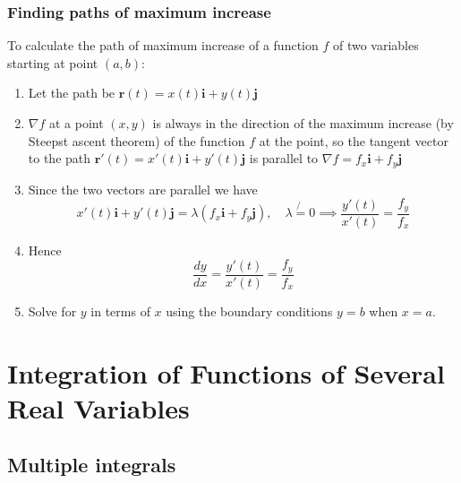 \documentclass[12pt]{article}
\begin{document}
		\subsubsection{Finding paths of maximum increase}
		To calculate the path of maximum increase of a function $f$ of two variables starting at point $(a,b)$:
		\begin{enumerate}
			\item Let the path be $\mathbf{r}(t) = x(t)\mathbf{i} + y(t)\mathbf{j}$
			\item $\nabla f$ at a point $(x,y)$ is always in the direction of the maximum increase (by Steepst ascent theorem) of the function $f$ at the point,
					so the tangent vector to the path  $\mathbf{r}'(t) = x'(t)\mathbf{i} + y'(t)\mathbf{j}$ is parallel to $\nabla f = f_x \mathbf{i} + f_y \mathbf{j}$
			\item Since the two vectors are parallel we have
					\[
						x'(t) \mathbf{i} + y'(t) \mathbf{j} = \lambda ( f_x \mathbf{i} + f_y \mathbf{j} ),  \quad \lambda \not{=} 0 \implies \frac{y'(t)}{x'(t)} = \frac{f_y}{f_x}
					\]
			\item Hence
					\[
						\frac{dy}{dx} = \frac{y'(t)}{x'(t)} = \frac{f_y}{f_x}
					\]
			\item Solve for $y$ in terms of $x$ using the boundary conditions $y=b$ when $x=a$.
		\end{enumerate}

\section{Integration of Functions of Several Real Variables}
	
	\subsection{Multiple integrals}
\end{document}
